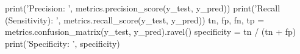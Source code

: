     print('Precision: ', metrics.precision_score(y_test, y_pred))
    print('Recall (Sensitivity): ', metrics.recall_score(y_test, y_pred))
    tn, fp, fn, tp = metrics.confusion_matrix(y_test, y_pred).ravel()
    specificity = tn / (tn + fp)
    print('Specificity: ', specificity)